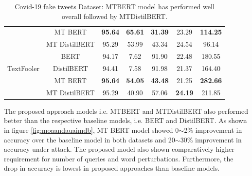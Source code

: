\documentclass[%
	BCOR=8mm, %
	DIV=12,
	toc=bibliography, %
	toc=listof, %
	oneside, %
	egregdoesnotlikesansseriftitles, %
	]{scrbook}
\begin{document}
\begin{table}[H]
{\begin{tabular}{|c|c|c|c|c|c|c|}
                & MT BERT &               \textbf{ 95.64} &                    \textbf{65.61} &                  \textbf{31.39}&                     23.29 &           \textbf{114.25} \\
                & MT DistilBERT &                95.29 &                    53.99 &                  43.34 &                     24.54 &            96.14 \\
                \midrule
                 & BERT &                94.17 &                     7.62 &                  91.90 &                     22.48 &           180.55 \\
                TextFooler & DistilBERT &                94.41 &                     7.58 &                  91.98 &                     21.37 &           164.40 \\
                & MT BERT &                \textbf{95.64} &                   \textbf{ 54.05} &                  \textbf{43.48} &                     21.25 &           \textbf{282.66} \\
                & MT DistilBERT &                95.29 &                    40.90 &                  57.06 &                    \textbf{ 24.19} &           211.85 \\
            \bottomrule
        \end{tabular}
    }
    \caption[Experiment Result of Covid-19 fake tweets]{Covid-19 fake tweets Dataset: MTBERT model has performed well overall followed by MTDistilBERT.  }
    \label{table:FakeNewsExpRes}
\end{table}
The proposed approach models i.e. MTBERT and MTDistilBERT also performed better than the respective baseline models, i.e. BERT and DistilBERT.  As shown in figure \ref{fig:moaandauaimdb}, MT BERT model showed 0$\sim$2\% improvement in accuracy over the baseline model in both datasets and 20$\sim$30\% improvement in accuracy under attack. The proposed model also shown comparatively higher requirement for number of queries and word perturbations. Furthermore, the drop in accuracy is lowest in proposed approaches than baseline models.
\end{document}
